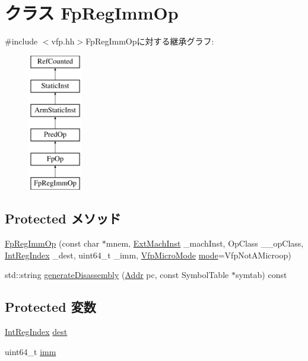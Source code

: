 \hypertarget{classArmISA_1_1FpRegImmOp}{
\section{クラス FpRegImmOp}
\label{classArmISA_1_1FpRegImmOp}
}


{\ttfamily \#include $<$vfp.hh$>$}FpRegImmOpに対する継承グラフ:\begin{figure}[H]
\begin{center}
\leavevmode
\includegraphics[height=6cm]{classArmISA_1_1FpRegImmOp}
\end{center}
\end{figure}
\subsection*{Protected メソッド}
\begin{DoxyCompactItemize}
\item 
\hyperlink{classArmISA_1_1FpRegImmOp_a855f484865f7972eb6b14d879544af1a}{FpRegImmOp} (const char $\ast$mnem, \hyperlink{classStaticInst_a5605d4fc727eae9e595325c90c0ec108}{ExtMachInst} \_\-machInst, OpClass \_\-\_\-opClass, \hyperlink{namespaceArmISA_ae64680ba9fb526106829d6bf92fc791b}{IntRegIndex} \_\-dest, uint64\_\-t \_\-imm, \hyperlink{namespaceArmISA_ad386ea556acd7cd538c64e2d73933714}{VfpMicroMode} \hyperlink{namespaceArmISA_a5f3b9b97eb2dfa29d33e74878455f90d}{mode}=VfpNotAMicroop)
\item 
std::string \hyperlink{classArmISA_1_1FpRegImmOp_a95d323a22a5f07e14d6b4c9385a91896}{generateDisassembly} (\hyperlink{classm5_1_1params_1_1Addr}{Addr} pc, const SymbolTable $\ast$symtab) const 
\end{DoxyCompactItemize}
\subsection*{Protected 変数}
\begin{DoxyCompactItemize}
\item 
\hyperlink{namespaceArmISA_ae64680ba9fb526106829d6bf92fc791b}{IntRegIndex} \hyperlink{classArmISA_1_1FpRegImmOp_aec72e8e45bdc87abeeeb75d2a8a9a716}{dest}
\item 
uint64\_\-t \hyperlink{classArmISA_1_1FpRegImmOp_a2b4406ad2843b5aa12d244d01d8fdc69}{imm}
\end{DoxyCompactItemize}


